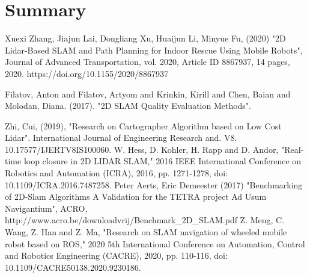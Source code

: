 \documentclass[12pt, a4paper, onecolumn]{article}
\begin{document}
\section{Summary}
\newpage
\begin{thebibliography}{9}
Xuexi Zhang, Jiajun Lai, Dongliang Xu, Huaijun Li, Minyue Fu, (2020) "2D Lidar-Based SLAM and Path Planning for Indoor Rescue Using Mobile Robots", Journal of Advanced Transportation, vol. 2020, Article ID 8867937, 14 pages, 2020. https://doi.org/10.1155/2020/8867937

Filatov, Anton and Filatov, Artyom and Krinkin, Kirill and Chen, Baian and Molodan, Diana. (2017). "2D SLAM Quality Evaluation Methods". 

Zhi, Cui, (2019), "Research on Cartographer Algorithm based on Low Cost Lidar". International Journal of Engineering Research and. V8. 10.17577/IJERTV8IS100060. 
W. Hess, D. Kohler, H. Rapp and D. Andor, "Real-time loop closure in 2D LIDAR SLAM," 2016 IEEE International Conference on Robotics and Automation (ICRA), 2016, pp. 1271-1278, doi: 10.1109/ICRA.2016.7487258.
Peter Aerts, Eric Demeester (2017) "Benchmarking of 2D-Slam Algorithms
A Validation for the TETRA project Ad Usum Navigantium", ACRO, http://www.acro.be/downloadvrij/Benchmark{\_}2D{\_}SLAM.pdf
Z. Meng, C. Wang, Z. Han and Z. Ma, "Research on SLAM navigation of wheeled mobile robot based on ROS," 2020 5th International Conference on Automation, Control and Robotics Engineering (CACRE), 2020, pp. 110-116, doi: 10.1109/CACRE50138.2020.9230186.
\end{thebibliography}
\end{document}
